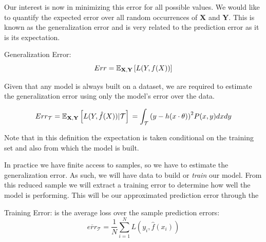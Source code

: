 Our interest is now in minimizing this error for all possible values. We would like to quantify the expected error over all random occurrences of $\textbf{X}$ and $\textbf{Y}$. This is known as the generalization error and is very related to the prediction error as it is its expectation.

\begin{definition}{Generalization Error:}
\begin{equation}
Err = \operatorname{\mathbb{E}}_{ \textbf{X}, \textbf{Y} } \left[ L(Y,f(X)) \right]
\end{equation}
\end{definition}

Given that any model is always built on a dataset, we are required to estimate the generalization error using only the model's error over the data.


\begin{equation}
	Err_{\mathcal{T}} = \operatorname{\mathbb{E}}_{\textbf{X},\textbf{Y}} \left[ L(Y,\hat{f}(X)) | \mathcal{T}\right] \\
	= \int_{\mathcal{T}} {(y - h(x \cdot \theta) )}^2 P(x,y)dxdy
\end{equation}


Note that in this definition the expectation is taken conditional on the training set and also from which the model is built.


In practice we have finite access to samples, so we have to estimate the generalization error. As such, we will have data to build or \textit{train} our model. From this reduced sample we will extract a training error to determine how well the model is performing. This will be our approximated prediction error through the
\begin{definition}{Training Error:}
	is the average loss over the sample prediction errors:
	$$ \overline{err}_{\mathcal{T}} = \frac{1}{N} \sum_{i=1}^N L(y_i, \hat{f}(x_i) )$$
\end{definition}\label{def:trainingError}


